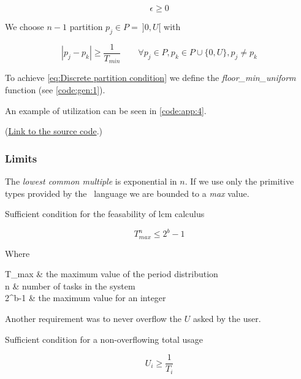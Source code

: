 \documentclass[a4paper,12pt]{article}
\begin{document}
\begin{equation}
	\epsilon \geq 0
	\label{eq:Usage shift polarity}
\end{equation}

We choose $n-1$ partition $p_j \in P = ~]0, U[$ with

\begin{equation}
	|p_j - p_k| \geq \frac{1}{T_{min}} \qquad \forall p_j \in P, p_k \in P \cup \{0, U\}, p_j \neq p_k
	\label{eq:Discrete partition condition}
\end{equation}

To achieve \ref{eq:Discrete partition condition} we define the \emph{floor\_min\_uniform} function (see \ref{code:gen:1}).


An example of utilization can be seen in \ref{code:app:4}.

(\href{../h/os/generator.h}{Link to the source code}.)

\subsubsection{Limits}

The \emph{lowest common multiple} is exponential in $n$. If we use only the primitive types provided by the \CXX~language we are bounded to a \emph{max} value.

Sufficient condition for the feasability of lcm calculus

\begin{equation}
	T_{max}^n \leq 2^b-1
	\label{eq:Lowest common multiple condition}
\end{equation}

Where
\begin{conditions}
	T_{max}		&	the maximum value of the period distribution\\
	n			&	number of tasks in the system \\
	2^b-1		&	the maximum value for an integer
\end{conditions}

Another requirement was to never overflow the $U$ asked by the user.

Sufficient condition for a non-overflowing total usage

\begin{equation}
	U_i \geq \frac{1}{T_i}
	\label{eq:Usage no-overflow warranty}
\end{equation}
\end{document}

